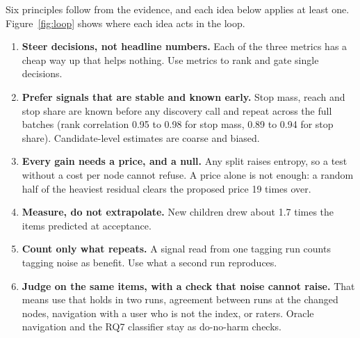 \documentclass[10pt,a4paper]{article}
\begin{document}
Six principles follow from the evidence, and each idea below applies at least one.
Figure~\ref{fig:loop} shows where each idea acts in the loop.
\begin{enumerate}
\item \textbf{Steer decisions, not headline numbers.} Each of the three metrics has a cheap way up that helps nothing. Use metrics to rank and gate single decisions.
\item \textbf{Prefer signals that are stable and known early.} Stop mass, reach and stop share are known before any discovery call and repeat across the full batches (rank correlation 0.95 to 0.98 for stop mass, 0.89 to 0.94 for stop share). Candidate-level estimates are coarse and biased.
\item \textbf{Every gain needs a price, and a null.} Any split raises entropy, so a test without a cost per node cannot refuse. A price alone is not enough: a random half of the heaviest residual clears the proposed price 19 times over.
\item \textbf{Measure, do not extrapolate.} New children drew about 1.7 times the items predicted at acceptance.
\item \textbf{Count only what repeats.} A signal read from one tagging run counts tagging noise as benefit. Use what a second run reproduces.
\item \textbf{Judge on the same items, with a check that noise cannot raise.} That means use that holds in two runs, agreement between runs at the changed nodes, navigation with a user who is not the index, or raters. Oracle navigation and the RQ7 classifier stay as do-no-harm checks.
\end{enumerate}
\end{document}
